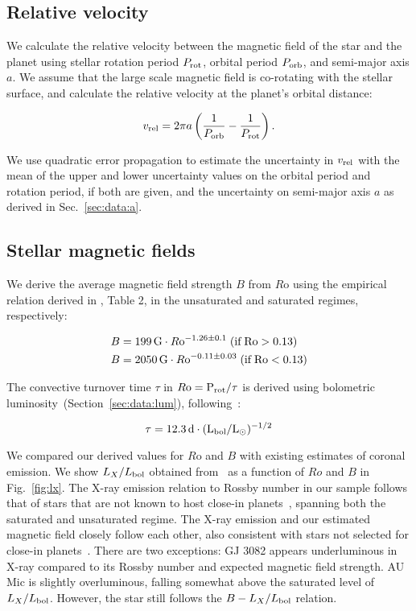 \documentclass[twocolumn]{aastex631}
\begin{document}
\subsection{Relative velocity}
\label{sec:methods:relvel}
We calculate the relative velocity between the magnetic field of the star and the planet using stellar rotation period $P_{\rm rot}$, orbital period $P_{\rm orb}$, and semi-major axis $a$. We assume that the large scale magnetic field is co-rotating with the stellar surface, and calculate the relative velocity at the planet's orbital distance:

\begin{equation}
    v_{\rm rel} = 2 \pi a \left(\frac{1}{P_{\rm orb}} - \frac{1}{P_{\rm rot}}\right).
\end{equation}

We use quadratic error propagation to estimate the uncertainty in $v_{\rm rel}$ with the mean of the upper and lower uncertainty values on the orbital period and rotation period, if both are given, and the uncertainty on semi-major axis $a$ as derived in Sec.~\ref{sec:data:a}. 

\subsection{Stellar magnetic fields}
\label{sec:methods:bfield}
We derive the average magnetic field strength $B$ from $R$o using the empirical relation derived in \citet{reiners2022magnetism},  Table 2, in the unsaturated and saturated regimes, respectively:

\begin{eqnarray}
    B &= 199\,\text{G} \cdot R\rm o^{-1.26\pm 0.1} \;(\text{if}\; Ro > 0.13) \label{Eq3}\\
    B &= 2050\,\text{G} \cdot R\rm o^{-0.11\pm 0.03} \;(\text{if}\; Ro < 0.13) \label{Eq4}
\end{eqnarray} 

The convective turnover time $\tau$ in  $R \rm o=P_{rot}/\tau$ is derived using bolometric luminosity~(Section~\ref{sec:data:lum}), following~\citet{reiners2014generalized, reiners2022magnetism}:

\begin{equation}
    \tau = 12.3\, \rm d \cdot (L_{\rm bol}/L_\odot)^{-1/2}
\end{equation}

We compared our derived values for $R$o and $B$ with existing estimates of coronal emission. We show $L_X/L_{\rm bol}$ obtained from~\citet{foster2022exoplanet} as a function of $Ro$ and $B$ in Fig.~\ref{fig:lx}. The X-ray emission relation to Rossby number in our sample follows that of stars that are not known to host close-in planets~\citep{wright2011stellaractivityrotation}, spanning both the saturated and unsaturated regime. The X-ray emission and our estimated magnetic field closely follow each other, also consistent with stars not selected for close-in planets~\citep{reiners2022magnetism}. There are two exceptions: GJ 3082 appears underluminous in X-ray compared to its Rossby number and expected magnetic field strength. AU Mic is slightly overluminous, falling somewhat above the saturated level of $L_X/L_{\rm bol}$. However, the star still follows the $B-L_X/L_{\rm bol}$ relation.  
\end{document}
